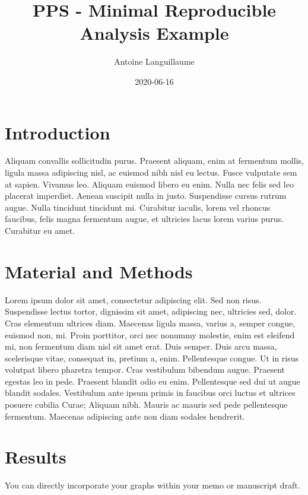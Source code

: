 \documentclass[
]{article}
\title{PPS - Minimal Reproducible Analysis Example}
\author{Antoine Languillaume}
\date{2020-06-16}
\begin{document}
\maketitle

\hypertarget{introduction}{%
\section{Introduction}\label{introduction}}

Aliquam convallis sollicitudin purus. Praesent aliquam, enim at
fermentum mollis, ligula massa adipiscing nisl, ac euismod nibh nisl eu
lectus. Fusce vulputate sem at sapien. Vivamus leo. Aliquam euismod
libero eu enim. Nulla nec felis sed leo placerat imperdiet. Aenean
suscipit nulla in justo. Suspendisse cursus rutrum augue. Nulla
tincidunt tincidunt mi. Curabitur iaculis, lorem vel rhoncus faucibus,
felis magna fermentum augue, et ultricies lacus lorem varius purus.
Curabitur eu amet.

\hypertarget{material-and-methods}{%
\section{Material and Methods}\label{material-and-methods}}

Lorem ipsum dolor sit amet, consectetur adipiscing elit. Sed non risus.
Suspendisse lectus tortor, dignissim sit amet, adipiscing nec, ultricies
sed, dolor. Cras elementum ultrices diam. Maecenas ligula massa, varius
a, semper congue, euismod non, mi. Proin porttitor, orci nec nonummy
molestie, enim est eleifend mi, non fermentum diam nisl sit amet erat.
Duis semper. Duis arcu massa, scelerisque vitae, consequat in, pretium
a, enim. Pellentesque congue. Ut in risus volutpat libero pharetra
tempor. Cras vestibulum bibendum augue. Praesent egestas leo in pede.
Praesent blandit odio eu enim. Pellentesque sed dui ut augue blandit
sodales. Vestibulum ante ipsum primis in faucibus orci luctus et
ultrices posuere cubilia Curae; Aliquam nibh. Mauris ac mauris sed pede
pellentesque fermentum. Maecenas adipiscing ante non diam sodales
hendrerit.

\newpage

\hypertarget{results}{%
\section{Results}\label{results}}

You can directly incorporate your graphs within your memo or manuscript
draft.
\end{document}
